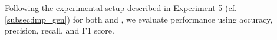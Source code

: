 Following the experimental setup described in Experiment 5 (cf. \autoref{subsec:imp_gen}) for both \impAppr{} and \unmasking{}, we evaluate performance using accuracy, precision, recall, and F1 score.


